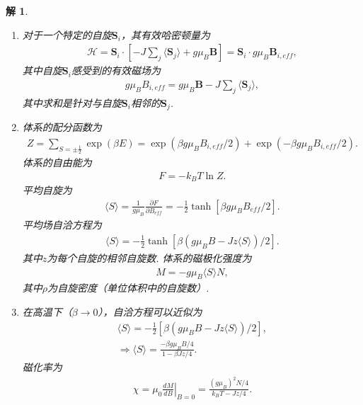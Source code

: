 \documentclass[UTF8,10pt,a4paper]{article}
\theoremstyle{Problem}
\theoremstyle{Solution}
\newtheorem*{sol}{解}
\begin{document}
\begin{sol}
    \begin{enumerate}
        \item[(a)] 对于一个特定的自旋$\bm{S}_i$，其有效哈密顿量为
        \begin{align}
            \mathcal{H}=\bm{S}_i\cdot\left[-J\sum_j\langle\bm{S}_j\rangle+g\mu_B\bm{B}\right]=\bm{S}_i\cdot g\mu_B\bm{B}_{i,eff},
        \end{align}
        其中自旋$\bm{S}_i$感受到的有效磁场为
        \begin{align}
            g\mu_BB_{i,eff}=g\mu_B\bm{B}-J\sum_j\langle\bm{S}_j\rangle,
        \end{align}
        其中求和是针对与自旋$\bm{S}_i$相邻的$\bm{S}_j$.
        \item[(b)] 体系的配分函数为
        \begin{align}
            Z=\sum_{S=\pm\frac{1}{2}}\exp(\beta E)=\exp(\beta g\mu_BB_{i,eff}/2)+\exp(-\beta g\mu_B B_{i,eff}/2).
        \end{align}
        体系的自由能为
        \begin{align}
            F=-k_BT\ln Z.
        \end{align}
        平均自旋为
        \begin{align}
            \langle S\rangle=\frac{1}{g\mu_B}\frac{\partial F}{\partial B_{eff}}=-\frac{1}{2}\tanh[\beta g\mu_BB_{eff}/2].
        \end{align}
        平均场自洽方程为
        \begin{align}
            \langle S\rangle=-\frac{1}{2}\tanh[\beta(g\mu_BB-Jz\langle S\rangle)/2].
        \end{align}
        其中$z$为每个自旋的相邻自旋数. 体系的磁极化强度为
        \begin{align}
            M=-g\mu_B\langle S\rangle N,
        \end{align}
        其中$\rho$为自旋密度（单位体积中的自旋数）.
        \item[(c)] 在高温下（$\beta\rightarrow 0$），自洽方程可以近似为
        \begin{gather}
            \langle S\rangle=-\frac{1}{2}[\beta(g\mu_BB-Jz\langle S\rangle)/2],\\
            \Longrightarrow\langle S\rangle=\frac{-\beta g\mu_BB/4}{1-\beta Jz/4}.
        \end{gather}
        磁化率为
        \begin{align}
            \chi=\mu_0\left.\frac{dM}{dB}\right\rvert_{B=0}=\frac{(g\mu_B)^2N/4}{k_BT-Jz/4}.

\end{align}
\end{enumerate}
\end{sol}
\end{document}
